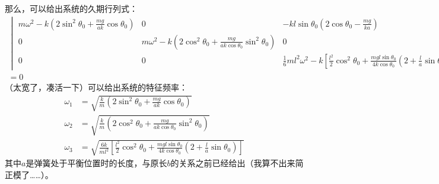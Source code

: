 \documentclass[a4paper]{ctexart}
\begin{document}
    那么，可以给出系统的久期行列式：
    \begin{gather}
        \begin{vmatrix}
            m\omega^{2} - k\left(2\sin^{2}\theta_{0} + \frac{mg}{ak}\cos\theta_{0}\right) & 0 & - kl\sin\theta_{0}\left(2\cos\theta_{0} - \frac{mg}{ka}\right)\\
            0 & m\omega^{2} - k\left(2\cos^{2}\theta_{0} + \frac{mg}{ak\cos\theta_{0}}\sin^{2}\theta_{0}\right) & 0\\
            0 & 0 & \frac{1}{6}ml^{2}\omega^{2} - k\left[\frac{l^{2}}{2}\cos^{2}\theta_{0} + \frac{mgl\sin\theta_{0}}{4k\cos\theta_{0}}\left(2 + \frac{l}{a}\sin\theta_{0}\right)\right]
        \end{vmatrix}
        \\
        = 0
    \end{gather}
    （太宽了，凑活一下）可以给出系统的特征频率：
    \begin{align}
        \omega_{1} &= \sqrt{\frac{k}{m}\left(2\sin^{2}\theta_{0} + \frac{mg}{ak}\cos\theta_{0}\right)}\\
        \omega_{2} &= \sqrt{\frac{k}{m}\left(2\cos^{2}\theta_{0} + \frac{mg}{ak\cos\theta_{0}}\sin^{2}\theta_{0}\right)}\\
        \omega_{3} &= \sqrt{\frac{6k}{ml^{2}}\left[\frac{l^{2}}{2}\cos^{2}\theta_{0} + \frac{mgl\sin\theta_{0}}{4k\cos\theta_{0}}\left(2 + \frac{l}{a}\sin\theta_{0}\right)\right]}
    \end{align}
    其中$a$是弹簧处于平衡位置时的长度，与原长$b$的关系之前已经给出（我算不出来简正模了……）。
\end{document}
